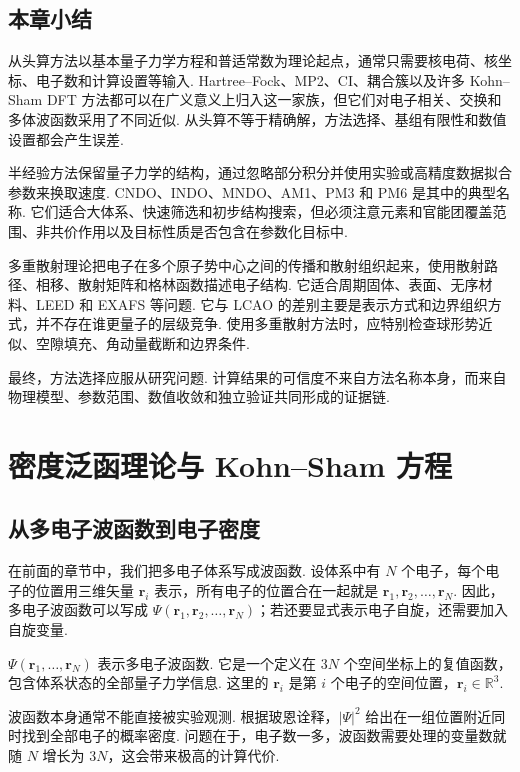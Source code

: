 \documentclass[UTF8,11pt,a4paper,openany]{ctexbook}
\newcommand{\R}{\mathbb R}\newcommand{\C}{\mathbb C}\newcommand{\p}{\partial}
\begin{document}
\section{本章小结}

从头算方法以基本量子力学方程和普适常数为理论起点，通常只需要核电荷、核坐标、电子数和计算设置等输入. Hartree--Fock、MP2、CI、耦合簇以及许多 Kohn--Sham DFT 方法都可以在广义意义上归入这一家族，但它们对电子相关、交换和多体波函数采用了不同近似. 从头算不等于精确解，方法选择、基组有限性和数值设置都会产生误差. 

半经验方法保留量子力学的结构，通过忽略部分积分并使用实验或高精度数据拟合参数来换取速度. CNDO、INDO、MNDO、AM1、PM3 和 PM6 是其中的典型名称. 它们适合大体系、快速筛选和初步结构搜索，但必须注意元素和官能团覆盖范围、非共价作用以及目标性质是否包含在参数化目标中. 

多重散射理论把电子在多个原子势中心之间的传播和散射组织起来，使用散射路径、相移、散射矩阵和格林函数描述电子结构. 它适合周期固体、表面、无序材料、LEED 和 EXAFS 等问题. 它与 LCAO 的差别主要是表示方式和边界组织方式，并不存在谁更量子的层级竞争. 使用多重散射方法时，应特别检查球形势近似、空隙填充、角动量截断和边界条件. 

最终，方法选择应服从研究问题. 计算结果的可信度不来自方法名称本身，而来自物理模型、参数范围、数值收敛和独立验证共同形成的证据链. 
\chapter{密度泛函理论与 Kohn--Sham 方程}

\section{从多电子波函数到电子密度}

在前面的章节中，我们把多电子体系写成波函数. 设体系中有 $N$ 个电子，每个电子的位置用三维矢量 $\mathbf r_i$ 表示，所有电子的位置合在一起就是
$\mathbf r_1,\mathbf r_2,\ldots,\mathbf r_N$. 因此，多电子波函数可以写成
$\Psi(\mathbf r_1,\mathbf r_2,\ldots,\mathbf r_N)$；若还要显式表示电子自旋，还需要加入自旋变量. 

\begin{notationbox}
$\Psi(\mathbf r_1,\ldots,\mathbf r_N)$ 表示多电子波函数. 它是一个定义在 $3N$ 个空间坐标上的复值函数，包含体系状态的全部量子力学信息. 这里的 $\mathbf r_i$ 是第 $i$ 个电子的空间位置，$\mathbf r_i\in\R^3$. 
\end{notationbox}

波函数本身通常不能直接被实验观测. 根据玻恩诠释，$|\Psi|^2$ 给出在一组位置附近同时找到全部电子的概率密度. 问题在于，电子数一多，波函数需要处理的变量数就随 $N$ 增长为 $3N$，这会带来极高的计算代价. 
\end{document}
